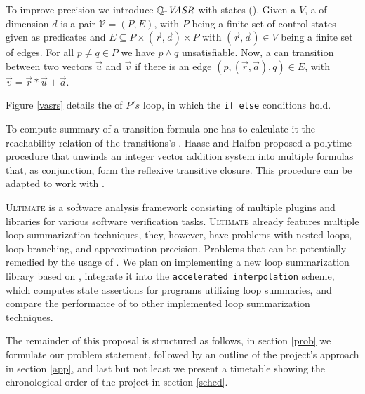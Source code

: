 To improve precision we introduce $\mathit{\mathbb{Q} \text{-}VASR}$ with states (\qvasrs). Given a \qvasr $V$, a \qvasrs of dimension $d$ is a pair $\mathcal{V} = (P, E)$, with $P$ being a finite set of control states given as predicates and $E \subseteq P \times (\vec{r}, \vec{a}) \times P$ with $(\vec{r}, \vec{a}) \in V$ being a finite set of edges. For all $p \neq q \in P$ we have $p \land q$ unsatisfiable. Now, a \qvasrs can transition between two vectors $\vec{u}$ and $\vec{v}$ if there is an edge $(p, (\vec{r}, \vec{a}), q) \in E$, with $\vec{v} = \vec{r} * \vec{u} + \vec{a}$. \par
Figure \ref{vasrs} details the \qvasrs of $P's$ loop, in which the \texttt{if else} conditions hold. \par
To compute summary of a transition formula one has to calculate it the reachability relation of the transitions's \qvasrs. Haase and Halfon \cite{DBLP:conf/rp/HaaseH14} proposed a polytime procedure that unwinds an integer vector addition system into multiple formulas that, as conjunction, form the reflexive transitive closure. This procedure can be adapted to work with \qvasrs. \\ \par

\textsc{Ultimate}\cite{Zitat02} is a software analysis framework consisting of multiple plugins and libraries for various software verification tasks. \textsc{Ultimate} already features multiple loop summarization techniques, they, however, have problems with nested loops, loop branching, and approximation precision. Problems that can be potentially remedied by the usage of \qvasrs. We plan on implementing a new loop summarization library based on \qvasrs, integrate it into the \texttt{accelerated interpolation} scheme, which computes state assertions for programs utilizing loop summaries, and compare the performance of \qvasrs to other implemented loop summarization techniques. \par
The remainder of this proposal is structured as follows, in section \ref{prob} we formulate our problem statement, followed by an outline of the project's approach in section \ref{app}, and last but not least we present a timetable showing the chronological order of the project in section \ref{sched}.
